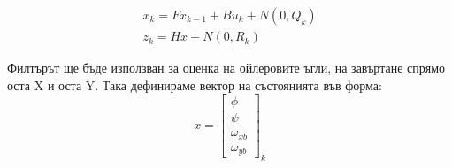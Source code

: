 \begin{align}
    x_k = F x_{k-1} + B u_k + N(0, Q_k) \\
    z_k = H x + N(0, R_k)
\end{align}

Филтърът ще бъде използван за оценка на ойлеровите ъгли, на завъртане спрямо оста X и оста Y.
Така дефинираме вектор на състоянията във форма:
\begin{equation*}
    x = 
    \begin{bmatrix}
        \phi\\
        \psi\\
        \omega_{xb}\\
        \omega_{yb}
    \end{bmatrix}_k
\end{equation*}

